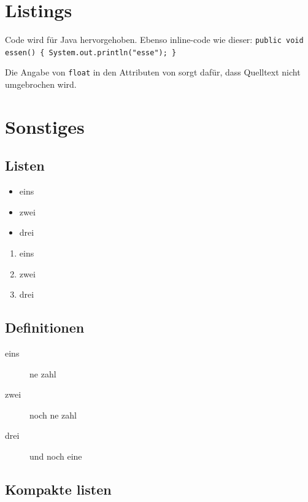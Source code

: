 \section{Listings}

Code wird für Java hervorgehoben. Ebenso inline-code wie dieser: \lstinline|public void essen() { System.out.println("esse"); }|






Die Angabe von \lstinline|float| in den Attributen von \lstinline|| sorgt dafür, dass Quelltext nicht umgebrochen wird. 


\section{Sonstiges}
\subsection{Listen}
\begin{itemize}
\item eins
\item zwei
\item drei
\end{itemize}

\begin{enumerate}
\item eins
\item zwei
\item drei
\end{enumerate}

\subsection{Definitionen}
\begin{description}
\item[eins] ne zahl
\item[zwei] noch ne zahl
\item[drei] und noch eine
\end{description}

\subsection{Kompakte listen}
